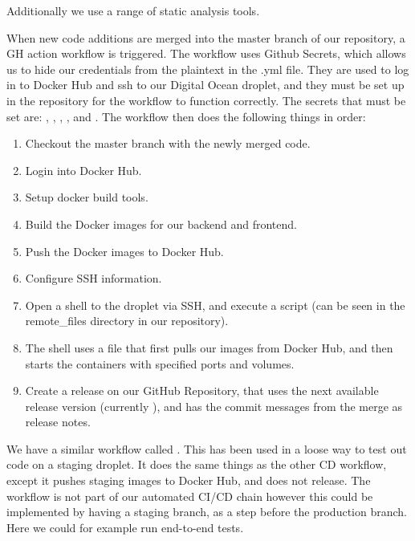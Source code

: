 Additionally we use a range of static analysis tools. 

When new code additions are merged into the master branch of our repository, a GH action workflow  is triggered. The workflow uses Github Secrets, which allows us to hide our credentials from the plaintext in the .yml file. They are used to log in to Docker Hub and ssh to our Digital Ocean droplet, and they must be set up in the repository for the workflow to function correctly. The secrets that must be set are: , , , , and . The workflow then does the following things in order:

\begin{enumerate}
    \item Checkout the master branch with the newly merged code.
    \item Login into Docker Hub.
    \item Setup docker build tools.
    \item Build the Docker images for our backend and frontend.
    \item Push the Docker images to Docker Hub.
    \item Configure SSH information.
    \item Open a shell to the droplet via SSH, and execute a script  (can be seen in the remote\_files directory in our repository).
    \item The shell uses a  file that first pulls our images from Docker Hub, and then starts the containers with specified ports and volumes.
    \item Create a release on our GitHub Repository, that uses the next available release version (currently ), and has the commit messages from the merge as release notes.
\end{enumerate}

We have a similar workflow called . This has been used in a loose way to test out code on a staging droplet. It does the same things as the other \gls{CD} workflow, except it pushes staging images to Docker Hub, and does not release. The workflow is not part of our automated \gls{CI}/\gls{CD} chain however this could be implemented by having a staging branch, as a step before the production branch. Here we could for example run end-to-end tests.


